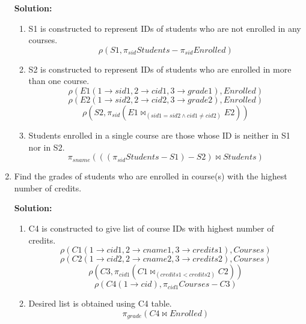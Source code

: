 \begin{enumerate}
  \textbf{Solution:}
  \begin{enumerate}
  \item{S1 is constructed to represent IDs of students who are not enrolled in any courses.}
  $$\displaystyle \rho(S1, \pi_{sid}Students-\pi_{sid}Enrolled)$$
  \item{S2 is constructed to represent IDs of students who are enrolled in more than one course.}
  $$\displaystyle \rho(E1(1\rightarrow sid1, 2\rightarrow cid1, 3\rightarrow grade1),Enrolled)$$
  $$\rho(E2(1\rightarrow sid2, 2\rightarrow cid2, 3\rightarrow grade2),Enrolled)$$
  $$\rho(S2,\pi_{sid}(E1 \Join_{(sid1=sid2\wedge cid1\neq cid2)} E2) ) $$
  \item{Students enrolled in a single course are those whose ID is neither in S1 nor in S2.}
  $$\displaystyle \pi_{sname}( ((\pi_{sid}Students-S1)-S2)\Join Students)$$
  \end{enumerate}

  \item Find the grades of students who are enrolled in course(s) with the highest number of credits.

  \textbf{Solution:}
  \begin{enumerate}
  \item C4 is constructed to give list of course IDs with highest number of credits.
  $$\displaystyle \rho(C1(1\rightarrow cid1, 2\rightarrow cname1, 3\rightarrow credits1),Courses)$$
  $$\rho(C2(1\rightarrow cid2, 2\rightarrow cname2, 3\rightarrow credits2),Courses)$$
  $$\rho(C3,\pi_{cid1}(C1 \Join_{(credits1<credits2)} C2)) $$
  $$\rho(C4(1 \rightarrow cid),\pi_{cid1}Courses-C3)$$
  \item Desired list is obtained using C4 table.
  $$ \pi_{grade}(C4 \Join Enrolled) $$
  \end{enumerate}

\end{enumerate}
